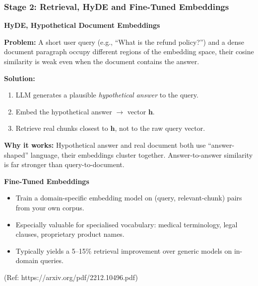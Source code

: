 \begin{frame}[fragile]\frametitle{Stage 2: Retrieval, HyDE and Fine-Tuned Embeddings}

\textbf{HyDE, Hypothetical Document Embeddings}

\textbf{Problem:} A short user query (e.g., ``What is the refund policy?'') and a dense document paragraph occupy different regions of the embedding space, their cosine similarity is weak even when the document contains the answer.

\textbf{Solution:}
\begin{enumerate}
  \item LLM generates a plausible \textit{hypothetical answer} to the query.
  \item Embed the hypothetical answer $\rightarrow$ vector $\mathbf{h}$.
  \item Retrieve real chunks closest to $\mathbf{h}$, not to the raw query vector.
\end{enumerate}

\textbf{Why it works:} Hypothetical answer and real document both use ``answer-shaped'' language, their embeddings cluster together. Answer-to-answer similarity is far stronger than query-to-document.

\vspace{0.4em}
\textbf{Fine-Tuned Embeddings}
\begin{itemize}
  \item Train a domain-specific embedding model on (query, relevant-chunk) pairs from your own corpus.
  \item Especially valuable for specialised vocabulary: medical terminology, legal clauses, proprietary product names.
  \item Typically yields a 5--15\% retrieval improvement over generic models on in-domain queries.
\end{itemize}

{\tiny (Ref: https://arxiv.org/pdf/2212.10496.pdf)}

\end{frame}



